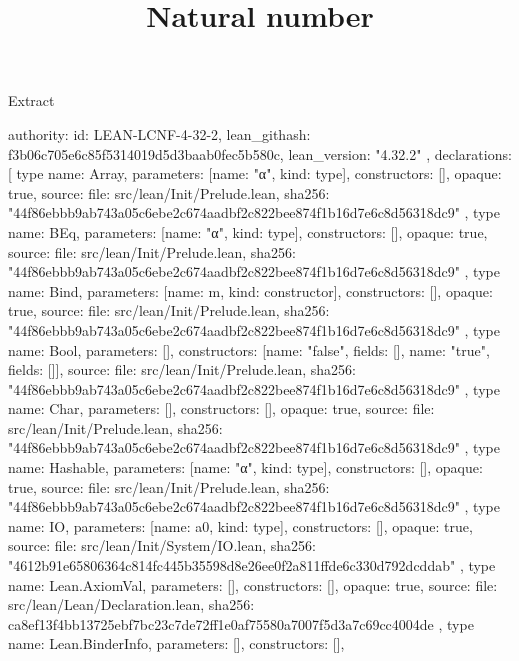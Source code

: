 \begin{lexlean}{Extract}
\title{Natural number}
\begin{toolingmodule}
{
  authority: {
    id: LEAN-LCNF-4-32-2,
    lean_githash: f3b06c705e6c85f5314019d5d3baab0fec5b580c,
    lean_version: "4.32.2"
  },
  declarations: [
    type{
      name: Array,
      parameters: [{name: "α", kind: type{}}],
      constructors: [],
      opaque: true,
      source: {
        file: src/lean/Init/Prelude.lean,
        sha256: "44f86ebbb9ab743a05c6ebe2c674aadbf2c822bee874f1b16d7e6c8d56318dc9"
      }
    },
    type{
      name: BEq,
      parameters: [{name: "α", kind: type{}}],
      constructors: [],
      opaque: true,
      source: {
        file: src/lean/Init/Prelude.lean,
        sha256: "44f86ebbb9ab743a05c6ebe2c674aadbf2c822bee874f1b16d7e6c8d56318dc9"
      }
    },
    type{
      name: Bind,
      parameters: [{name: m, kind: constructor{}}],
      constructors: [],
      opaque: true,
      source: {
        file: src/lean/Init/Prelude.lean,
        sha256: "44f86ebbb9ab743a05c6ebe2c674aadbf2c822bee874f1b16d7e6c8d56318dc9"
      }
    },
    type{
      name: Bool,
      parameters: [],
      constructors: [{name: "false", fields: []}, {name: "true", fields: []}],
      source: {
        file: src/lean/Init/Prelude.lean,
        sha256: "44f86ebbb9ab743a05c6ebe2c674aadbf2c822bee874f1b16d7e6c8d56318dc9"
      }
    },
    type{
      name: Char,
      parameters: [],
      constructors: [],
      opaque: true,
      source: {
        file: src/lean/Init/Prelude.lean,
        sha256: "44f86ebbb9ab743a05c6ebe2c674aadbf2c822bee874f1b16d7e6c8d56318dc9"
      }
    },
    type{
      name: Hashable,
      parameters: [{name: "α", kind: type{}}],
      constructors: [],
      opaque: true,
      source: {
        file: src/lean/Init/Prelude.lean,
        sha256: "44f86ebbb9ab743a05c6ebe2c674aadbf2c822bee874f1b16d7e6c8d56318dc9"
      }
    },
    type{
      name: IO,
      parameters: [{name: a0, kind: type{}}],
      constructors: [],
      opaque: true,
      source: {
        file: src/lean/Init/System/IO.lean,
        sha256: "4612b91e65806364c814fc445b35598d8e26ee0f2a811ffde6c330d792dcddab"
      }
    },
    type{
      name: Lean.AxiomVal,
      parameters: [],
      constructors: [],
      opaque: true,
      source: {
        file: src/lean/Lean/Declaration.lean,
        sha256: ca8ef13f4bb13725ebf7bc23c7de72ff1e0af75580a7007f5d3a7c69cc4004de
      }
    },
    type{
      name: Lean.BinderInfo,
      parameters: [],
      constructors: [],
}}
\end{toolingmodule}
\end{lexlean}
